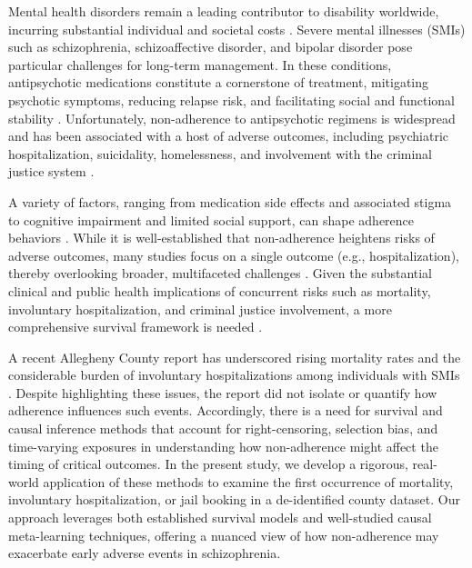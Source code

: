 Mental health disorders remain a leading contributor to disability worldwide, incurring substantial individual and societal costs \citep{whiteford2013global, rehm2019global, gbd2022global}. 
Severe mental illnesses (SMIs) such as schizophrenia, schizoaffective disorder, and bipolar disorder pose particular challenges for long-term management. 
In these conditions, antipsychotic medications constitute a cornerstone of treatment, mitigating psychotic symptoms, reducing relapse risk, and facilitating social and functional stability \citep{yatham2018canadian, keepers2020american, leucht2012antipsychotic, tiihonen2017real}. 
Unfortunately, non-adherence to antipsychotic regimens is widespread and has been associated with a host of adverse outcomes, including psychiatric hospitalization, suicidality, homelessness, and involvement with the criminal justice system \citep{ascher2006medication, velligan2009expert, velligan2017psychiatric, correll2018comparison}.

A variety of factors, ranging from medication side effects and associated stigma to cognitive impairment and limited social support, can shape adherence behaviors \citep{kane2016comprehensive, semahegn2020psychotropic}. 
While it is well-established that non-adherence heightens risks of adverse outcomes, many studies focus on a single outcome (e.g., hospitalization), thereby overlooking broader, multifaceted challenges \citep{walter2019multiple, mok2024multiple}.
Given the substantial clinical and public health implications of concurrent risks such as mortality, involuntary hospitalization, and criminal justice involvement, a more comprehensive survival framework is needed \citep{chen2022influencing}.

A recent Allegheny County report has underscored rising mortality rates and the considerable burden of involuntary hospitalizations among individuals with SMIs \citep{welle2023involuntary}. 
Despite highlighting these issues, the report did not isolate or quantify how adherence influences such events.
Accordingly, there is a need for survival and causal inference methods that account for right-censoring, selection bias, and time-varying exposures in understanding how non-adherence might affect the timing of critical outcomes.
In the present study, we develop a rigorous, real-world application of these methods to examine the first occurrence of mortality, involuntary hospitalization, or jail booking in a de-identified county dataset.
Our approach leverages both established survival models and well-studied causal meta-learning techniques, offering a nuanced view of how non-adherence may exacerbate early adverse events in schizophrenia.

